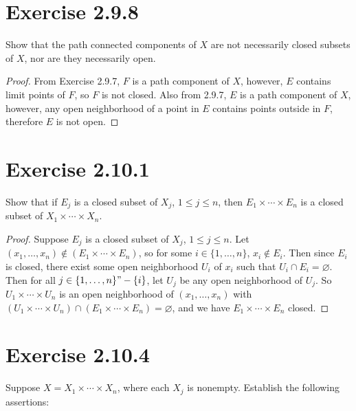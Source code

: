 \documentclass[12pt]{article}
\newenvironment{problem}
    {\begin{lrbox}{\mybox}\begin{minipage}{\textwidth-10pt}}
    {\end{minipage}\end{lrbox}\framebox[6.5in]{\usebox{\mybox}}}
\let\emptyset\varnothing
\begin{document}
\section*{Exercise 2.9.8}
\begin{problem}
    Show that the path connected components of $X$ are not necessarily closed subsets of $X$, nor are they necessarily open.
\end{problem}

\begin{proof}
    From Exercise 2.9.7, $F$ is a path component of $X$, however, $E$ contains limit points of $F$, so $F$ is not closed. Also from 2.9.7, $E$ is a path component of $X$, however, any open neighborhood of a point in $E$ contains points outside in $F$, therefore $E$ is not open.
    
\end{proof}

\section*{Exercise 2.10.1}
\begin{problem}
     Show that if $E_j$ is a closed subset of $X_j$, $1\leq j\leq n$, then $E_1 \times \cdots \times E_n$ is a closed subset of $X_1\times \cdots \times X_n$.
\end{problem}

\begin{proof}
    Suppose $E_j$ is a closed subset of $X_j$, $1\leq j\leq n$. Let $(x_1,\dots, x_n)\notin (E_1\times \cdots \times E_n)$, so for some $i\in\{1,\dots,n\}$, $x_i\notin E_i$. Then since $E_i$ is closed, there exist some open neighborhood $U_i$ of $x_i$ such that $U_i\cap E_i = \emptyset$. Then for all $j\in\{1,\dots,n\}"-\{i\}$, let $U_j$ be any open neighborhood of $U_j$. So $U_1\times \cdots \times U_n$ is an open neighborhood of $(x_1,\dots,x_n)$ with $(U_1\times \cdots \times U_n)\cap(E_1\times \cdots \times E_n) = \emptyset$, and we have $E_1\times \cdots \times E_n$ closed.
    
\end{proof}

\section*{Exercise 2.10.4}
\begin{problem}
    Suppose $X=X_1\times \cdots \times X_n$, where each $X_j$ is nonempty. Establish the following assertions:
\end{problem}
\end{document}
